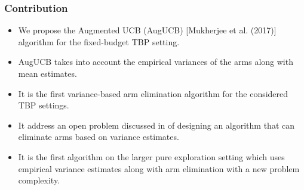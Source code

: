 \begin{frame}
\frametitle{Contribution}
\begin{itemize}
\item<1-> We propose the Augmented UCB (AugUCB) [{Mukherjee et al. (2017)}]  algorithm for the fixed-budget TBP setting.
\item<2-> AugUCB takes into account the empirical variances of the arms along with mean estimates.
\item<3-> It is the first variance-based arm elimination algorithm for the considered TBP settings. 
\item<4-> It address an open problem discussed in \cite{auer2010ucb} of designing an algorithm that can eliminate arms based on variance estimates.
\item<5-> It is the first algorithm on the larger pure exploration setting which uses empirical variance estimates along with arm elimination with a new problem complexity.
\end{itemize}
\end{frame}


%


